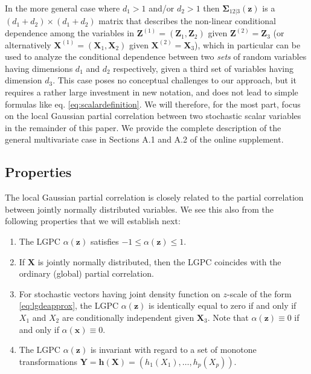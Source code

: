 \documentclass[
  12pt,
  letterpaper]{article}
\providecommand{\tightlist}{%
  \setlength{\itemsep}{0pt}\setlength{\parskip}{0pt}}
\newcommand{\X}{\bm{X}}
\newcommand{\Xone}{\bm{X}^{(1)}}
\newcommand{\Xtwo}{\bm{X}^{(2)}}
\newcommand{\x}{\bm{x}}
\newcommand{\Z}{\bm{Z}}
\newcommand{\z}{\bm{z}}
\newcommand{\Zone}{\bm{Z}^{(1)}}
\newcommand{\Ztwo}{\bm{Z}^{(2)}}
\newcommand{\Y}{\bm{Y}}
\newcommand{\fSigma}{\bm{\Sigma}}
\theoremstyle{definition}
\theoremstyle{definition}
\theoremstyle{definition}
\theoremstyle{remark}
\begin{document}
In the more general case where \(d_1 > 1\) and/or \(d_2 > 1\) then \(\fSigma_{12|3}(\z)\) is a \((d_1+d_2)\times (d_1+d_2)\) matrix that describes the non-linear conditional dependence among the variables in \(\Zone = (\Z_1, \Z_2)\) given \(\Ztwo = \Z_3\) (or alternatively \(\Xone = (\X_1, \X_2)\) given \(\Xtwo = \X_3\)), which in particular can be used to analyze the conditional dependence between two \emph{sets} of random variables having dimensions \(d_1\) and \(d_2\) respectively, given a third set of variables having dimension \(d_3\). This case poses no conceptual challenges to our approach, but it requires a rather large investment in new notation, and does not lead to simple formulas like eq. \eqref{eq:scalardefinition}. We will therefore, for the most part, focus on the local Gaussian partial correlation between two stochastic scalar variables in the remainder of this paper. We provide the complete description of the general multivariate case in Sections A.1 and A.2 of the online supplement.

\hypertarget{properties}{%
\subsection{Properties}\label{properties}}

The local Gaussian partial correlation is closely related to the partial correlation between jointly normally distributed variables. We see this also from the following properties that we will establish next:

\begin{enumerate}
\def\labelenumi{\arabic{enumi}.}
\tightlist
\item
  The LGPC \(\alpha(\z)\) satisfies \(-1 \leq \alpha(\z) \leq 1\).
\item
  If \(\X\) is jointly normally distributed, then the LGPC coincides with the ordinary (global) partial correlation.
\item
  For stochastic vectors having joint density function on \(z\)-scale of the form \eqref{eq:lgdeapprox}, the LGPC \(\alpha(\z)\) is identically equal to zero if and only if \(X_1\) and \(X_2\) are conditionally independent given \(\X_3\). Note that \(\alpha(\z) \equiv 0\) if and only if \(\alpha(\x) \equiv 0\). \label{prop:char}
\item
  The LGPC \(\alpha(\z)\) is invariant with regard to a set of monotone transformations \(\Y = \bm{h}(\X) = (h_1(X_1), \ldots, h_p(X_p))\).
\end{enumerate}
\end{document}
